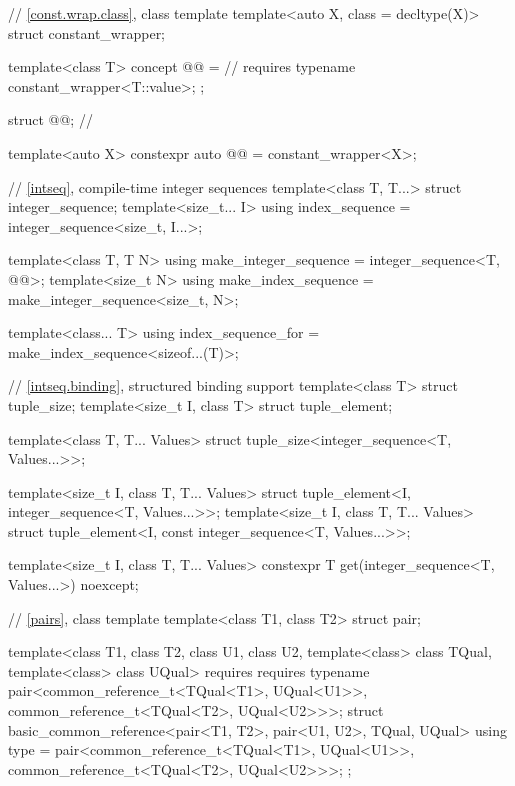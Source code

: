 \begin{codeblock}
{  // \ref{const.wrap.class}, class template 
  template<auto X, class = decltype(X)>
    struct constant_wrapper;

  template<class T>
    concept @@ =           // \expos
      requires { typename constant_wrapper<T::value>; };

  struct @@;                  // \expos

  template<auto X>
    constexpr auto @@ = constant_wrapper<X>{};

  // \ref{intseq}, compile-time integer sequences%
%
%
  template<class T, T...>
    struct integer_sequence;
  template<size_t... I>
    using index_sequence = integer_sequence<size_t, I...>;

  template<class T, T N>
    using make_integer_sequence = integer_sequence<T, @\seebelow{}@>;
  template<size_t N>
    using make_index_sequence = make_integer_sequence<size_t, N>;

  template<class... T>
    using index_sequence_for = make_index_sequence<sizeof...(T)>;

  // \ref{intseq.binding}, structured binding support
  template<class T> struct tuple_size;
  template<size_t I, class T> struct tuple_element;

  template<class T, T... Values>
    struct tuple_size<integer_sequence<T, Values...>>;

  template<size_t I, class T, T... Values>
    struct tuple_element<I, integer_sequence<T, Values...>>;
  template<size_t I, class T, T... Values>
    struct tuple_element<I, const integer_sequence<T, Values...>>;

  template<size_t I, class T, T... Values>
    constexpr T get(integer_sequence<T, Values...>) noexcept;

  // \ref{pairs}, class template 
  template<class T1, class T2>
    struct pair;

  template<class T1, class T2, class U1, class U2,
           template<class> class TQual, template<class> class UQual>
    requires requires { typename pair<common_reference_t<TQual<T1>, UQual<U1>>,
                                      common_reference_t<TQual<T2>, UQual<U2>>>; }
  struct basic_common_reference<pair<T1, T2>, pair<U1, U2>, TQual, UQual> {
    using type = pair<common_reference_t<TQual<T1>, UQual<U1>>,
                      common_reference_t<TQual<T2>, UQual<U2>>>;
  };

}
\end{codeblock}
